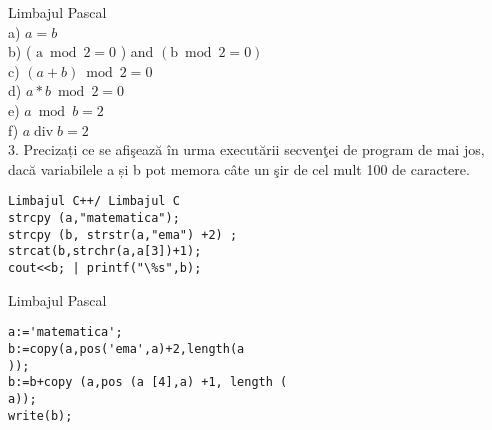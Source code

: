 Limbajul Pascal\\
a) $a=b$\\
b) ( $\mathrm{a} \bmod 2=0$ ) and $(\mathrm{b} \bmod 2=0)$\\
c) $(a+b) \bmod 2=0$\\
d) $a * b \bmod 2=0$\\
e) $a \bmod b=2$\\
f) $a \operatorname{div} b=2$\\
3. Precizați ce se afişează în urma executării secvenţei de program de mai jos, dacă variabilele a și b pot memora câte un şir de cel mult 100 de caractere.

\begin{verbatim}
Limbajul C++/ Limbajul C
strcpy (a,"matematica");
strcpy (b, strstr(a,"ema") +2) ;
strcat(b,strchr(a,a[3])+1);
cout<<b; | printf("\%s",b);
\end{verbatim}

Limbajul Pascal

\begin{verbatim}
a:='matematica';
b:=copy(a,pos('ema',a)+2,length(a
));
b:=b+copy (a,pos (a [4],a) +1, length (
a));
write(b);
\end{verbatim}

